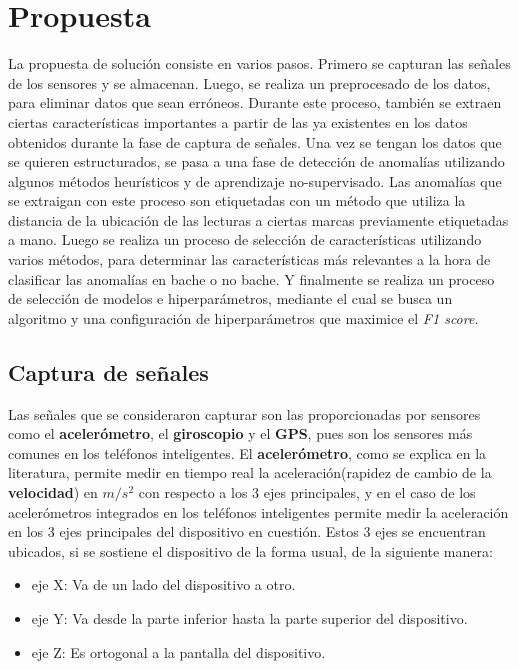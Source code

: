 \chapter{Propuesta}\label{chapter:proposal}
	La propuesta de solución consiste en varios pasos. Primero se capturan las señales de los sensores y se almacenan.
	Luego, se realiza un preprocesado de los datos, para eliminar datos que sean erróneos. Durante este proceso, también
	se extraen ciertas características importantes a partir de las ya existentes en los datos obtenidos durante la fase
	de captura de señales. Una vez se tengan los datos que se quieren estructurados, se pasa a una fase de detección de
	anomalías utilizando algunos métodos heurísticos y de aprendizaje no-supervisado. Las anomalías que se extraigan con
	este proceso son etiquetadas con un método que utiliza la distancia de la ubicación de las lecturas a ciertas marcas
	previamente etiquetadas a mano. Luego se realiza un proceso de selección de características utilizando varios métodos, 
	para determinar las características más relevantes a la hora de clasificar las anomalías en bache o no bache. Y
	finalmente se realiza un proceso de selección de modelos e hiperparámetros, mediante el cual se busca un algoritmo
	y una configuración de hiperparámetros que maximice el \emph{F1 score}.

\section{Captura de señales}
	Las señales que se consideraron capturar son las proporcionadas por sensores como el \textbf{acelerómetro},
	el \textbf{giroscopio} y el \textbf{GPS}, pues son los sensores más comunes en los teléfonos inteligentes. El
	\textbf{acelerómetro}, como se explica en la literatura, permite medir en tiempo real la aceleración(rapidez de
	cambio de la \textbf{velocidad}) en $m/s^2$ con respecto a los 3 ejes principales, y en el caso de los
	acelerómetros integrados en los teléfonos inteligentes permite medir la aceleración en los 3 ejes
	principales del dispositivo en cuestión. Estos 3 ejes se encuentran ubicados, si se sostiene el
	dispositivo de la forma usual, de la siguiente manera:

	\begin{itemize}
		\item eje X: Va de un lado del dispositivo a otro.
		\item eje Y: Va desde la parte inferior hasta la parte superior del dispositivo.
		\item eje Z: Es ortogonal a la pantalla del dispositivo.
	\end{itemize}
	
